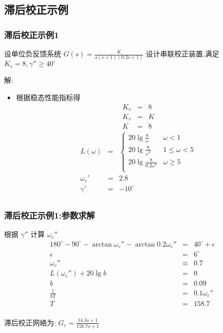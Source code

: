 \documentclass[table]{beamer}
\begin{document}
\subsection{滞后校正示例}
\label{sec-3-2}
\begin{frame}
\frametitle{滞后校正示例1}
\label{sec-3-2-1}

设单位负反馈系统 $G(s)=\frac{K}{s(s+1)(0.2s+1)}$ 设计串联校正装置,满足  $K_v=8, \gamma''\geq 40^{\circ}$ 

解:

\begin{itemize}
\item <2->根据稳态性能指标得
      \begin{eqnarray*}
      K_v & = &8 \\
      K_v &= & K \\
       K &=& 8
      \end{eqnarray*}
      \begin{eqnarray*}
      L(\omega) & = & \begin{cases}20\lg\frac{8}{\omega} & \omega <1 \\
                                   20\lg\frac{8}{\omega^2} & 1\leq \omega < 5 \\
                                   20\lg\frac{8}{0.2\omega^3} &  \omega \geq 5 \\  \end{cases}\\
      \omega_c' &=& 2.8 \\
      \gamma' &=& -10^{\circ} \\
      \end{eqnarray*}
\end{itemize}
\end{frame}
\begin{frame}
\frametitle{滞后校正示例1:参数求解}
\label{sec-3-2-2}

根据  $\gamma''$  计算  $\omega_c''$ 
\begin{eqnarray*}
180^{\circ}-90^{\circ}-\arctan\omega_c''-\arctan0.2\omega_c'' & = & 40^{\circ}+\epsilon\\
\epsilon &=& 6^{\circ} \\
\omega_c'' &\approx& 0.7 \\
L(\omega_c'') +20\lg b&=& 0 \\
b &=& 0.09 \\
\frac{1}{bT} &=& 0.1\omega_c''\\
T &=& 158.7 \\
\end{eqnarray*}

滞后校正网絡为:  $G_c=\frac{14.3s+1}{158.7s+1}$ 
\end{frame}
\end{document}
